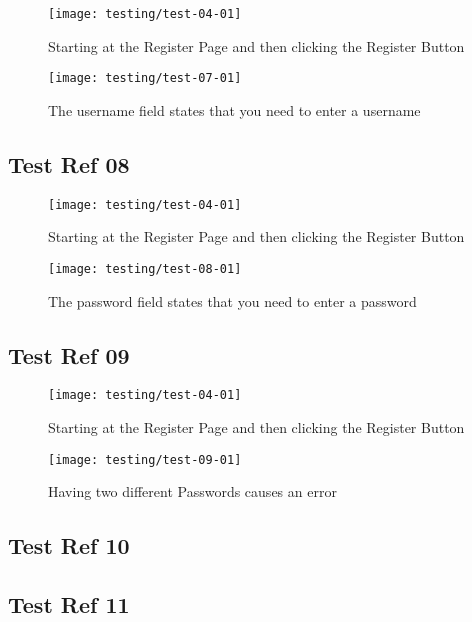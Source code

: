 \begin{figure}[H]
\centering
\texttt{[image: testing/test-04-01]}
\caption{Starting at the Register Page and then clicking the Register Button}
\label{test-07-01}
\end{figure}

\begin{figure}[H]
\centering
\texttt{[image: testing/test-07-01]}
\caption{The username field states that you need to enter a username}
\label{test-07-02}
\end{figure}

\subsection{Test Ref 08}

\begin{figure}[H]
\centering
\texttt{[image: testing/test-04-01]}
\caption{Starting at the Register Page and then clicking the Register Button}
\label{test-08-01}
\end{figure}

\begin{figure}[H]
\centering
\texttt{[image: testing/test-08-01]}
\caption{The password field states that you need to enter a password}
\label{test-08-02}
\end{figure}

\subsection{Test Ref 09}

\begin{figure}[H]
\centering
\texttt{[image: testing/test-04-01]}
\caption{Starting at the Register Page and then clicking the Register Button}
\label{test-09-01}
\end{figure}

\begin{figure}[H]
\centering
\texttt{[image: testing/test-09-01]}
\caption{Having two different Passwords causes an error}
\label{test-09-02}
\end{figure}

\subsection{Test Ref 10}
\subsection{Test Ref 11}
